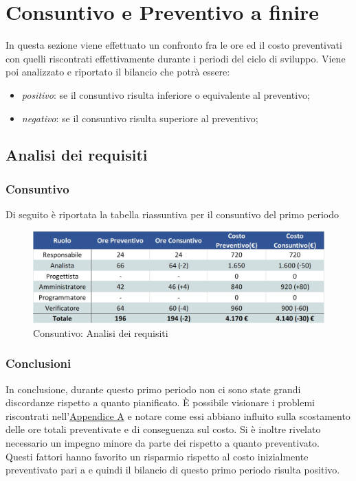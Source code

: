 \newpage
\section{Consuntivo e Preventivo a finire}

In questa sezione viene effettuato un confronto fra le ore ed il costo preventivati con quelli riscontrati effettivamente durante i periodi del ciclo di sviluppo.
Viene poi analizzato e riportato il bilancio che potrà essere:
\begin{itemize}
	\item \emph{positivo}: se il consuntivo risulta inferiore o equivalente al preventivo;
	\item \emph{negativo}: se il consuntivo risulta superiore al preventivo;
\end{itemize}

\subsection{Analisi dei requisiti}
\subsubsection{Consuntivo}
Di seguito è riportata la tabella riassuntiva per il consuntivo del primo periodo
\begin{figure}[h!]
	\centerline{\includegraphics[scale=0.55]{img/Preventivo/AnalisiRequisitiConsuntivo.jpg}}
	\caption{Consuntivo: Analisi dei requisiti}
\end{figure}

\subsubsection{Conclusioni}
In conclusione, durante questo primo periodo non ci sono state grandi discordanze rispetto a quanto pianificato. È possibile visionare i problemi riscontrati nell'\hyperref[RiscontroRischi]{Appendice A} e notare come essi abbiano influito sulla scostamento delle ore totali preventivate e di conseguenza sul costo. Si è inoltre rivelato necessario un impegno minore da parte dei \vers{} rispetto a quanto preventivato.\\
Questi fattori hanno favorito un risparmio rispetto al costo inizialmente preventivato pari a  e quindi il bilancio di questo primo periodo risulta positivo.
